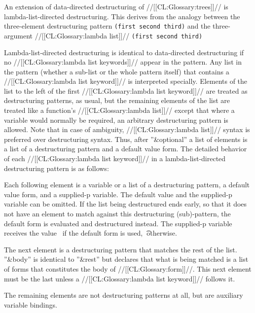 
An extension of data-directed destructuring of //[[CL:Glossary:trees]]// is lambda-list-directed destructuring.  This derives from the analogy between the three-element destructuring pattern
  {\tt 	(first second third)}
  and the three-argument //[[CL:Glossary:lambda list]]//
  {\tt	(first second third)}
 

Lambda-list-directed destructuring is identical to data-directed destructuring if no //[[CL:Glossary:lambda list keywords]]// appear in the pattern.   Any list in the pattern (whether a sub-list or the whole pattern itself) that contains a //[[CL:Glossary:lambda list keyword]]// is interpreted specially. Elements of the list to the left of the first //[[CL:Glossary:lambda list keyword]]// are treated as destructuring patterns, as usual, but the remaining elements of the list are treated like a function's  //[[CL:Glossary:lambda list]]// except that where a variable would normally be required, an arbitrary destructuring pattern is allowed.  Note that in case of ambiguity, //[[CL:Glossary:lambda list]]// syntax is preferred over destructuring syntax.  Thus, after ''&optional'' a list of elements is a list of a destructuring pattern and a default value form.
  The detailed behavior of each //[[CL:Glossary:lambda list keyword]]// in a  lambda-list-directed destructuring pattern is as follows:

\beginlist {}

Each following element is a variable or a list of a destructuring pattern, a default value form, and a supplied-p variable.  The default value and the supplied-p variable can be omitted.   If the list being destructured ends early, so that it does not have an element to match against this destructuring (sub)-pattern, the default form is evaluated and destructured instead.  The supplied-p variable receives the value  \nil\ if the default form is used, \t\ otherwise.

The next element is a destructuring pattern that matches the rest of the list.  ''&body'' is identical to ''&rest'' but declares that what is being matched is a list of forms that constitutes the body of //[[CL:Glossary:form]]//. This next element must be the last unless a //[[CL:Glossary:lambda list keyword]]// follows it.

The remaining elements are not destructuring patterns at all, but are auxiliary variable bindings.  

